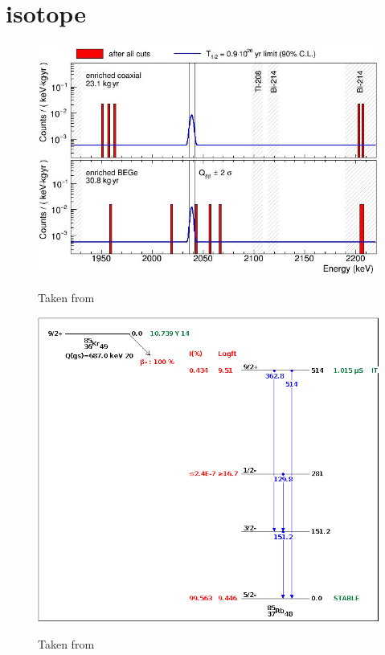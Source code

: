 \documentclass[encoding=utf8,british]{tumphthesis}
\begin{document}



\section{\Kr isotope}
\label{sec:Kry85}

\begin{figure}[t!]
	\centering
	\begin{minipage}{.50\textwidth}
		\centering
		\includegraphics[width=\textwidth]{./Bilder/GerdaErgebnisse.png}
		\caption{Taken from \cite{zsigmond_new_2018}}
		\label{fig:GerdaErgebnisse}
	\end{minipage}%
	\begin{minipage}{.70\textwidth}
		\centering
	\includegraphics[width=.44\textwidth]{./Bilder/Kr85Decay.png}
	\label{fig:Decay}
	\caption{
		Taken from \cite{noauthor_decay_nodate}
	}
	\end{minipage}
\end{figure}
\end{document}
